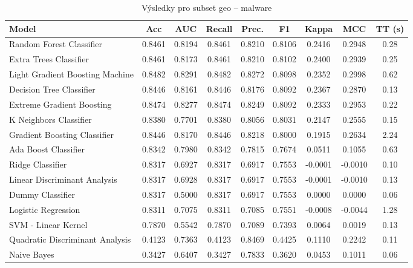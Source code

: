 \begin{table}[H]
  \centering
  \small
  \caption{Výsledky pro subset geo – malware}
  \begin{tabular}{|l|c|c|c|c|c|c|c|c|}
    \hline
    \textbf{Model} & \textbf{Acc} & \textbf{AUC} & \textbf{Recall} & \textbf{Prec.} & \textbf{F1} & \textbf{Kappa} & \textbf{MCC} & \textbf{TT (s)} \\
    \hline
    Random Forest Classifier & 0.8461 & 0.8194 & 0.8461 & 0.8210 & 0.8106 & 0.2416 & 0.2948 & 0.28 \\
    Extra Trees Classifier & 0.8461 & 0.8173 & 0.8461 & 0.8210 & 0.8102 & 0.2400 & 0.2939 & 0.25 \\
    Light Gradient Boosting Machine & 0.8482 & 0.8291 & 0.8482 & 0.8272 & 0.8098 & 0.2352 & 0.2998 & 0.62 \\
    Decision Tree Classifier & 0.8446 & 0.8161 & 0.8446 & 0.8176 & 0.8092 & 0.2367 & 0.2870 & 0.13 \\
    Extreme Gradient Boosting & 0.8474 & 0.8277 & 0.8474 & 0.8249 & 0.8092 & 0.2333 & 0.2953 & 0.22 \\
    K Neighbors Classifier & 0.8380 & 0.7701 & 0.8380 & 0.8056 & 0.8031 & 0.2147 & 0.2555 & 0.15 \\
    Gradient Boosting Classifier & 0.8446 & 0.8170 & 0.8446 & 0.8218 & 0.8000 & 0.1915 & 0.2634 & 2.24 \\
    Ada Boost Classifier & 0.8342 & 0.7980 & 0.8342 & 0.7815 & 0.7674 & 0.0511 & 0.1055 & 0.63 \\
    Ridge Classifier & 0.8317 & 0.6927 & 0.8317 & 0.6917 & 0.7553 & -0.0001 & -0.0010 & 0.10 \\
    Linear Discriminant Analysis & 0.8317 & 0.6928 & 0.8317 & 0.6917 & 0.7553 & -0.0001 & -0.0010 & 0.13 \\
    Dummy Classifier & 0.8317 & 0.5000 & 0.8317 & 0.6917 & 0.7553 & 0.0000 & 0.0000 & 0.06 \\
    Logistic Regression & 0.8311 & 0.7075 & 0.8311 & 0.7085 & 0.7551 & -0.0008 & -0.0044 & 1.28 \\
    SVM - Linear Kernel & 0.7870 & 0.5542 & 0.7870 & 0.7089 & 0.7393 & 0.0064 & 0.0019 & 0.13 \\
    Quadratic Discriminant Analysis & 0.4123 & 0.7363 & 0.4123 & 0.8469 & 0.4425 & 0.1110 & 0.2242 & 0.11 \\
    Naive Bayes & 0.3427 & 0.6407 & 0.3427 & 0.7833 & 0.3620 & 0.0453 & 0.1011 & 0.06 \\
    \hline
  \end{tabular}
\end{table}
\vspace{0.5cm}

